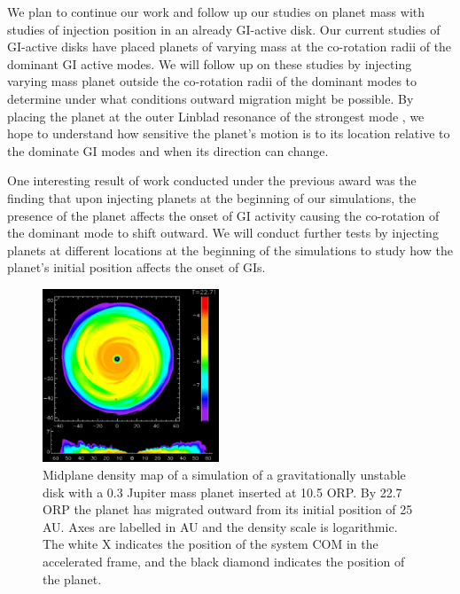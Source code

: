 \documentclass[12pt,preprint2]{aastex}
\begin{document}
We plan to continue our work and follow up our studies on planet mass with studies of injection position in an already
GI-active disk. Our current studies of GI-active disks have placed planets of varying mass at the co-rotation radii of
the dominant GI active modes. We will follow up on these studies by injecting varying mass planet outside the
co-rotation radii of the dominant modes to determine under what conditions outward migration might be possible. By
placing the planet at the outer Linblad resonance of the strongest mode \citep{binney1987}, we hope to understand how
sensitive the planet's motion is to its location relative to the dominate GI modes and when its direction can change.

One interesting result of work conducted under the previous award was the finding that upon injecting planets at the
beginning of our simulations, the presence of the planet affects the onset of GI activity causing the co-rotation of the
dominant mode to shift outward. We will conduct further tests by injecting planets at different locations at the
beginning of the simulations to study how the planet's initial position affects the onset of GIs.

\begin{figure} [t] %
\includegraphics[width=0.47\textwidth]{0.3JUP.eps}
\caption{Midplane density map of a simulation of a gravitationally unstable disk with a 0.3 Jupiter mass planet inserted
  at 10.5 ORP. By 22.7 ORP the planet has migrated outward from its initial position of 25 AU. Axes are labelled in AU
  and the density scale is logarithmic. The white X indicates the position of the system COM in the accelerated frame,
  and the black diamond indicates the position of the planet. \label{fig:modes}}
\end{figure}
\end{document}

